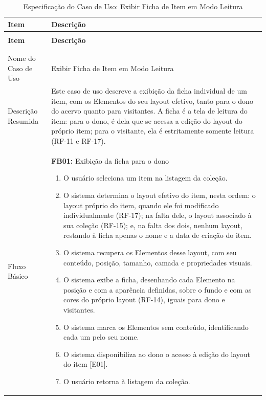 \renewcommand{\arraystretch}{1.3}
\FloatBarrier
\begin{longtable}{ >{\raggedright}p{2.8cm} | >{\raggedright\arraybackslash}p{10.7cm} }
\caption{Especificação do Caso de Uso: Exibir Ficha de Item em Modo Leitura} \label{tab:especExibirFicha} \\
\hline
\textbf{Item} & \textbf{Descrição} \\ \hline
\endfirsthead
\multicolumn{2}{c}{\quadroname\ \thequadro\ -- Continuação da página anterior} \\
\hline
\textbf{Item} & \textbf{Descrição} \\ \hline
\endhead
\hline \multicolumn{2}{r}{Continua na próxima página} \\
\endfoot
\hline
\multicolumn{2}{l}{\textbf{Fonte:} Elaborada pelo autor} \\
\endlastfoot

Nome do Caso de Uso & Exibir Ficha de Item em Modo Leitura \\ \hline

Descrição Resumida & Este caso de uso descreve a exibição da ficha individual de um item, com os Elementos do seu layout efetivo, tanto para o dono do acervo quanto para visitantes. A ficha é a tela de leitura do item: para o dono, é dela que se acessa a edição do layout do próprio item; para o visitante, ela é estritamente somente leitura (RF-11 e RF-17). \\ \hline

Fluxo Básico & \mbox{}
\textbf{FB01:} Exibição da ficha para o dono
\vspace{2pt}
\begin{enumerate}[nosep,leftmargin=1.2em,topsep=0pt,partopsep=0pt,parsep=0pt,itemsep=0pt,after=\vspace{2pt}]
    \item O usuário seleciona um item na listagem da coleção.
    \item O sistema determina o layout efetivo do item, nesta ordem: o layout próprio do item, quando ele foi modificado individualmente (RF-17); na falta dele, o layout associado à sua coleção (RF-15); e, na falta dos dois, nenhum layout, restando à ficha apenas o nome e a data de criação do item.
    \item O sistema recupera os Elementos desse layout, com seu conteúdo, posição, tamanho, camada e propriedades visuais.
    \item O sistema exibe a ficha, desenhando cada Elemento na posição e com a aparência definidas, sobre o fundo e com as cores do próprio layout (RF-14), iguais para dono e visitantes.
    \item O sistema marca os Elementos sem conteúdo, identificando cada um pelo seu nome.
    \item O sistema disponibiliza ao dono o acesso à edição do layout do item [E01].
    \item O usuário retorna à listagem da coleção.
\end{enumerate}
\mbox{} \\ \hline


\end{longtable}
